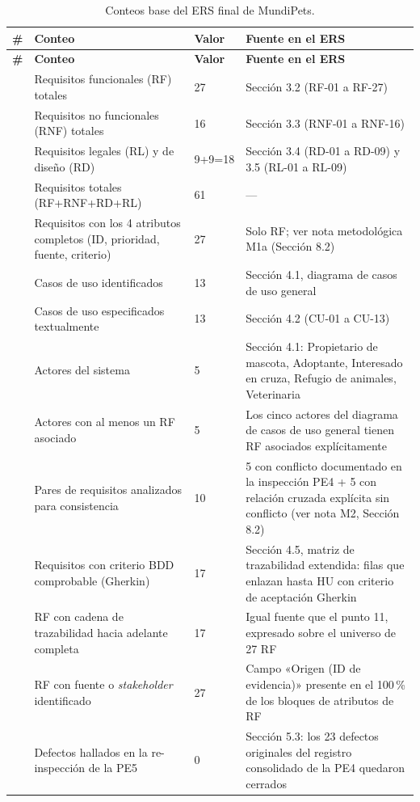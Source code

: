 \documentclass[11pt]{article}
\begin{document}
	\begin{longtable}{C{0.7cm} L{4.3cm} C{1.3cm} L{7.5cm}}
		\caption{Conteos base del ERS final de MundiPets.}\label{tab:conteos-base}\\
		\toprule
		\textbf{\#} & \textbf{Conteo} & \textbf{Valor} & \textbf{Fuente en el ERS} \\
		\midrule
		\endfirsthead
		\toprule
		\textbf{\#} & \textbf{Conteo} & \textbf{Valor} & \textbf{Fuente en el ERS} \\
		\midrule
		\endhead
		\bottomrule
		 & Requisitos funcionales (RF) totales & 27 & Sección 3.2 (RF-01 a RF-27) \\
		 & Requisitos no funcionales (RNF) totales & 16 & Sección 3.3 (RNF-01 a RNF-16) \\
		 & Requisitos legales (RL) y de diseño (RD) & 9+9=18 & Sección 3.4 (RD-01 a RD-09) y 3.5 (RL-01 a RL-09) \\
		 & Requisitos totales (RF+RNF+RD+RL) & 61 & --- \\
		 & Requisitos con los 4 atributos completos (ID, prioridad, fuente, criterio) & 27 & Solo RF; ver nota metodológica M1a (Sección 8.2) \\
		 & Casos de uso identificados & 13 & Sección 4.1, diagrama de casos de uso general \\
		 & Casos de uso especificados textualmente & 13 & Sección 4.2 (CU-01 a CU-13) \\
		 & Actores del sistema & 5 & Sección 4.1: Propietario de mascota, Adoptante, Interesado en cruza, Refugio de animales, Veterinaria \\
		 & Actores con al menos un RF asociado & 5 & Los cinco actores del diagrama de casos de uso general tienen RF asociados explícitamente \\
		 & Pares de requisitos analizados para consistencia & 10 & 5 con conflicto documentado en la inspección PE4 + 5 con relación cruzada explícita sin conflicto (ver nota M2, Sección 8.2) \\
		 & Requisitos con criterio BDD comprobable (Gherkin) & 17 & Sección 4.5, matriz de trazabilidad extendida: filas que enlazan hasta HU con criterio de aceptación Gherkin \\
		 & RF con cadena de trazabilidad hacia adelante completa & 17 & Igual fuente que el punto 11, expresado sobre el universo de 27 RF \\
		 & RF con fuente o \textit{stakeholder} identificado & 27 & Campo «Origen (ID de evidencia)» presente en el 100\,\% de los bloques de atributos de RF \\
		 & Defectos hallados en la re-inspección de la PE5 & 0 & Sección 5.3: los 23 defectos originales del registro consolidado de la PE4 quedaron cerrados \\
	\end{longtable}
	
\end{document}
